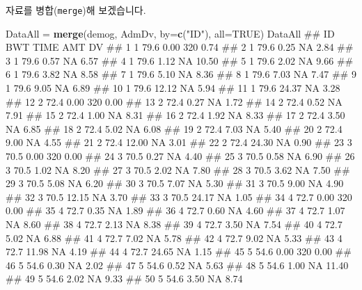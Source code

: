 \documentclass[10pt,]{krantz}
\makeatletter
\newenvironment{Shaded}{\begin{snugshade}}{\end{snugshade}}
\newcommand{\KeywordTok}[1]{\textcolor[rgb]{0.13,0.29,0.53}{\textbf{#1}}}
\newcommand{\DataTypeTok}[1]{\textcolor[rgb]{0.13,0.29,0.53}{#1}}
\newcommand{\StringTok}[1]{\textcolor[rgb]{0.31,0.60,0.02}{#1}}
\newcommand{\OtherTok}[1]{\textcolor[rgb]{0.56,0.35,0.01}{#1}}
\newcommand{\NormalTok}[1]{#1}
\newenvironment{kframe}{%
\medskip{}
\setlength{\fboxsep}{.8em}
 \def\at@end@of@kframe{}%
 \ifinner\ifhmode%
  \def\at@end@of@kframe{\end{minipage}}%
  \begin{minipage}{\columnwidth}%
 \fi\fi%
 \def\FrameCommand##1{\hskip\@totalleftmargin \hskip-\fboxsep
 \colorbox{shadecolor}{##1}\hskip-\fboxsep
     \hskip-\linewidth \hskip-\@totalleftmargin \hskip\columnwidth}%
 \MakeFramed {\advance\hsize-\width
   \@totalleftmargin\z@ \linewidth\hsize
   \@setminipage}}%
 {\par\unskip\endMakeFramed%
 \at@end@of@kframe}
\renewenvironment{Shaded}{\begin{kframe}}{\end{kframe}}
\theoremstyle{definition}
\theoremstyle{definition}
\theoremstyle{remark}
\makeatother
\begin{document}
자료를 병합(\texttt{merge})해 보겠습니다.

\begin{Shaded}
\begin{Highlighting}[]
\NormalTok{DataAll =}\StringTok{ }\KeywordTok{merge}\NormalTok{(demog, AdmDv, }\DataTypeTok{by=}\KeywordTok{c}\NormalTok{(}\StringTok{"ID"}\NormalTok{), }\DataTypeTok{all=}\OtherTok{TRUE}\NormalTok{)}
\NormalTok{DataAll}
\NormalTok{##     ID  BWT  TIME AMT    DV}
\NormalTok{## 1    1 79.6  0.00 320  0.74}
\NormalTok{## 2    1 79.6  0.25  NA  2.84}
\NormalTok{## 3    1 79.6  0.57  NA  6.57}
\NormalTok{## 4    1 79.6  1.12  NA 10.50}
\NormalTok{## 5    1 79.6  2.02  NA  9.66}
\NormalTok{## 6    1 79.6  3.82  NA  8.58}
\NormalTok{## 7    1 79.6  5.10  NA  8.36}
\NormalTok{## 8    1 79.6  7.03  NA  7.47}
\NormalTok{## 9    1 79.6  9.05  NA  6.89}
\NormalTok{## 10   1 79.6 12.12  NA  5.94}
\NormalTok{## 11   1 79.6 24.37  NA  3.28}
\NormalTok{## 12   2 72.4  0.00 320  0.00}
\NormalTok{## 13   2 72.4  0.27  NA  1.72}
\NormalTok{## 14   2 72.4  0.52  NA  7.91}
\NormalTok{## 15   2 72.4  1.00  NA  8.31}
\NormalTok{## 16   2 72.4  1.92  NA  8.33}
\NormalTok{## 17   2 72.4  3.50  NA  6.85}
\NormalTok{## 18   2 72.4  5.02  NA  6.08}
\NormalTok{## 19   2 72.4  7.03  NA  5.40}
\NormalTok{## 20   2 72.4  9.00  NA  4.55}
\NormalTok{## 21   2 72.4 12.00  NA  3.01}
\NormalTok{## 22   2 72.4 24.30  NA  0.90}
\NormalTok{## 23   3 70.5  0.00 320  0.00}
\NormalTok{## 24   3 70.5  0.27  NA  4.40}
\NormalTok{## 25   3 70.5  0.58  NA  6.90}
\NormalTok{## 26   3 70.5  1.02  NA  8.20}
\NormalTok{## 27   3 70.5  2.02  NA  7.80}
\NormalTok{## 28   3 70.5  3.62  NA  7.50}
\NormalTok{## 29   3 70.5  5.08  NA  6.20}
\NormalTok{## 30   3 70.5  7.07  NA  5.30}
\NormalTok{## 31   3 70.5  9.00  NA  4.90}
\NormalTok{## 32   3 70.5 12.15  NA  3.70}
\NormalTok{## 33   3 70.5 24.17  NA  1.05}
\NormalTok{## 34   4 72.7  0.00 320  0.00}
\NormalTok{## 35   4 72.7  0.35  NA  1.89}
\NormalTok{## 36   4 72.7  0.60  NA  4.60}
\NormalTok{## 37   4 72.7  1.07  NA  8.60}
\NormalTok{## 38   4 72.7  2.13  NA  8.38}
\NormalTok{## 39   4 72.7  3.50  NA  7.54}
\NormalTok{## 40   4 72.7  5.02  NA  6.88}
\NormalTok{## 41   4 72.7  7.02  NA  5.78}
\NormalTok{## 42   4 72.7  9.02  NA  5.33}
\NormalTok{## 43   4 72.7 11.98  NA  4.19}
\NormalTok{## 44   4 72.7 24.65  NA  1.15}
\NormalTok{## 45   5 54.6  0.00 320  0.00}
\NormalTok{## 46   5 54.6  0.30  NA  2.02}
\NormalTok{## 47   5 54.6  0.52  NA  5.63}
\NormalTok{## 48   5 54.6  1.00  NA 11.40}
\NormalTok{## 49   5 54.6  2.02  NA  9.33}
\NormalTok{## 50   5 54.6  3.50  NA  8.74}

\end{Highlighting}
\end{Shaded}
\end{document}

